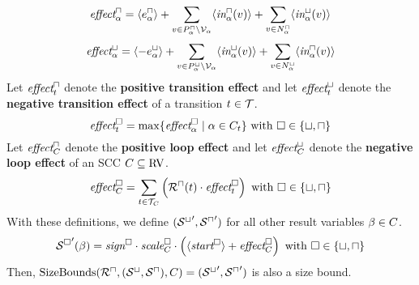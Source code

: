 \begin{theorem}
  \[ \emph{effect}^\sqcap_\alpha = \langle e^{\sqcap}_\alpha\rangle + \sum_{v \in P_\alpha^\sqcap \setminus \mathcal{V}_\alpha} \langle\emph{in}^\sqcap_\alpha(v)\rangle + \sum_{v \in N_\alpha^\sqcap} \langle\emph{in}^\sqcup_\alpha(v)\rangle \]
  \[ \emph{effect}^\sqcup_\alpha = \langle-e^{\sqcup}_\alpha\rangle + \sum_{v \in P_\alpha^\sqcup \setminus \mathcal{V}_\alpha} \langle\emph{in}^\sqcup_\alpha(v)\rangle + \sum_{v \in N_\alpha^\sqcup} \langle\emph{in}^\sqcap_\alpha(v)\rangle \]
  Let $\emph{effect}^\sqcap_t$ denote the \textbf{positive transition effect} and let $\emph{effect}^\sqcup_t$ denote the \textbf{negative transition effect} of a transition $t \in \mathcal{T}$.
  \[ \emph{effect}^\square_t = \max \lbrace \emph{effect}^\square_\alpha \mid \alpha \in C_t  \rbrace \text{ with } \square \in \lbrace \sqcup, \sqcap \rbrace \]
  Let $\emph{effect}^\sqcap_C$ denote the \textbf{positive loop effect} and let $\emph{effect}^\sqcup_C$ denote the \textbf{negative loop effect} of an SCC $C \subseteq \text{RV}$.
  \[ \emph{effect}^\square_C = \sum_{t \in \mathcal{T}_C} \left( {\mathcal{R}^\sqcap}(t) \cdot \emph{effect}^\square_t \right) \text{ with } \square \in \lbrace \sqcup, \sqcap \rbrace \]
  With these definitions, we define $({\mathcal{S}^\sqcup}', {\mathcal{S}^\sqcap}')$ for all other result variables $\beta \in C$.
  \[ {\mathcal{S}^\square}'(\beta) = \emph{sign}^\square \cdot \emph{scale}^\square_C \cdot \left( \langle\emph{start}^\square\rangle + \emph{effect}^\square_C \right) \text{ with } \square \in \lbrace \sqcup, \sqcap \rbrace \]
  Then, $\text{SizeBounds}({\mathcal{R}^\sqcap}, {({\mathcal{S}^\sqcup}, {\mathcal{S}^\sqcap})}, C) = ({\mathcal{S}^\sqcup}', {\mathcal{S}^\sqcap}')$ is also a size bound. 
\end{theorem}
